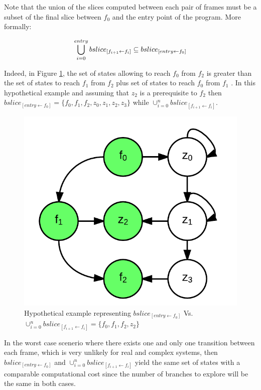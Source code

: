 \documentclass[times]{smrauth}
\begin{document}
Note that the union of the slices computed between each pair
of frames must be a subset of the final slice between $f_0$ and the
entry point of the program. More formally:

\begin{equation}
\centering
\begin{split}
\bigcup_{i=0}^{entry} bslice_{[f_{i+1} \leftarrow f_i]} \subseteq bslice_{[entry \leftarrow f_0]}
\end{split}
\end{equation}

Indeed, in Figure \ref{fig:jcharming-slice}, the set of states allowing to reach $f_0$ from
$f_2$ is greater than the set of states to reach $f_1$ from $f_2$ plus set
of states to reach $f_0$ from $f_1$ . In this hypothetical example and
assuming that $z_2$ is a prerequisite to $f_2$ then
$bslice_{[entry \leftarrow f_0]} = \{f_0 , f_1 , f_2 , z_0 , z_1 , z_2 , z_3 \}$
while $\cup_{i=0}^n bslice_{[f_{i+1} \leftarrow f_i]}$.

\begin{figure}[h!]
  \centering
    \includegraphics{media/jcharming-slices.png}
    \caption{Hypothetical example representing $bslice_{[entry \leftarrow f_0]}$ Vs. $\cup_{i=0}^n bslice_{[f_{i+1} \leftarrow f_i]} = \{f_0 , f_1 , f_2 , z_2 \}$
    \label{fig:jcharming-slice}}
\end{figure}

In the worst case scenerio where there exists one and only one
transition between each frame, which is very unlikely for real
and complex systems, then $bslice_{[entry \leftarrow f_0]}$ and
 $\cup_{i=0}^n bslice_{[f_{i+1} \leftarrow f_i]}$ yield the same set of states with a
comparable computational cost since the number of branches
to explore will be the same in both cases.
\end{document}
